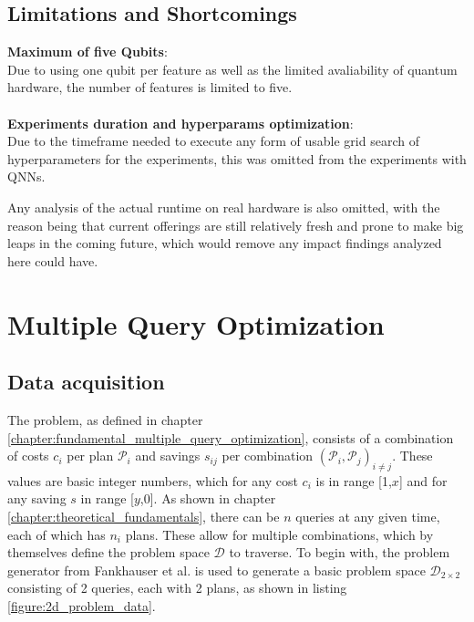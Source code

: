 \newpage

\subsection{Limitations and Shortcomings}
\label{subsection:limitations_and_shortcomings}

\textbf{Maximum of five Qubits}:\\
Due to using one qubit per feature as well as the limited avaliability of quantum hardware, the number of features is limited to five.
\\
\\
\textbf{Experiments duration and hyperparams optimization}:\\
Due to the timeframe needed to execute any form of usable grid search of hyperparameters for the experiments, this was omitted from the experiments with QNNs.\par
Any analysis of the actual runtime on real hardware is also omitted, with the reason being that current offerings are still relatively fresh and prone to make big leaps in the coming future, which would remove any impact findings analyzed here could have.

\clearpage


\section{Multiple Query Optimization}

\subsection{Data acquisition}
\label{chapter:mqo_data_acquisition}

The problem, as defined in chapter \ref{chapter:fundamental_multiple_query_optimization}, consists of a combination of costs $c_i$ per plan $\mathcal{P}_i$ and savings $s_{ij}$ per combination $
\left(\mathcal{P}_i,\mathcal{P}_j\right)_{i \neq j}$. These values are basic integer numbers, which for any cost $c_i$ is in range [1,$x$] and for any saving $s$ in range [$y$,0]. As shown in chapter \ref{chapter:theoretical_fundamentals}, there can be $n$ queries at any given time, each of which has $n_i$ plans. These allow for multiple combinations, which by themselves define the problem space $\mathcal{D}$ to traverse. To begin with, the problem generator from Fankhauser et al.\cite{fankhauser_multiple_2021} is used to generate a basic problem space $\mathcal{D}_{2\times2}$ consisting of 2 queries, each with 2 plans, as shown in listing \ref{figure:2d_problem_data}.

